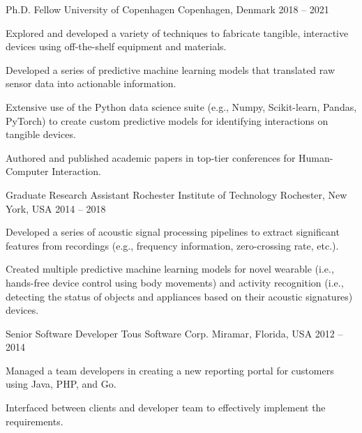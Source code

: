 \begin{cventries}
  \cventry
    {Ph.D. Fellow}
    {University of Copenhagen}
    {Copenhagen, Denmark}
    {2018 -- 2021}
    {
      \begin{cvitems}
        \item Explored and developed a variety of techniques to fabricate
        tangible, interactive devices using off-the-shelf equipment and
        materials.
        \item Developed a series of predictive machine learning models that
        translated raw sensor data into actionable information.
        \item Extensive use of the Python data science suite (e.g., Numpy,
        Scikit-learn, Pandas, PyTorch) to create custom predictive models for
        identifying interactions on tangible devices.
        \item Authored and published academic papers in top-tier conferences for
        Human-Computer Interaction.
      \end{cvitems}
      \vspace{1em}
    }

  \cventry
    {Graduate Research Assistant}
    {Rochester Institute of Technology}
    {Rochester, New York, USA}
    {2014 -- 2018}
    {
      \begin{cvitems}
        \item Developed a series of acoustic signal processing pipelines to
        extract significant features from recordings (e.g., frequency
        information, zero-crossing rate, etc.).
        \item Created multiple predictive machine learning models for novel
        wearable (i.e., hands-free device control using body movements)
        and activity recognition (i.e., detecting the status of objects and
        appliances based on their acoustic signatures) devices.
      \end{cvitems}
    }

  \cventry
    {Senior Software Developer}
    {Tous Software Corp.}
    {Miramar, Florida, USA}
    {2012 -- 2014}
    {
      \begin{cvitems}
        \item Managed a team developers in creating a new reporting portal for
          customers using Java, PHP, and Go.
        \item Interfaced between clients and developer team to effectively
          implement the requirements.
      \end{cvitems}
    }

\end{cventries}
